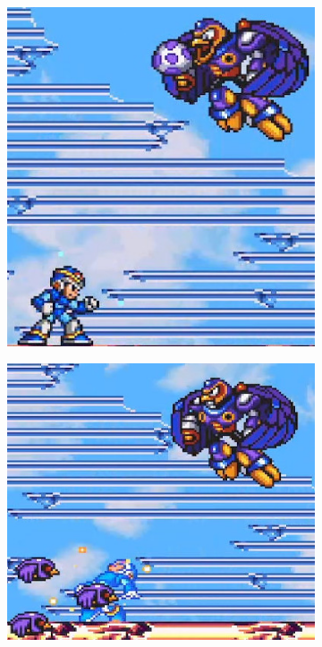  
 \begin{figure}[h]
 	\centering
 	\begin{subfigure}{0.3\linewidth}
 		\centering
 		\includegraphics[width=\linewidth]{figures/X1/Eagle_egg_1.jpg}
 		\caption{}
 	\end{subfigure}
 	\begin{subfigure}{0.35\linewidth}
 		\centering
 		\includegraphics[width=\linewidth]{figures/X1/Eagle_egg_2.jpg}

\end{subfigure}
\end{figure}
